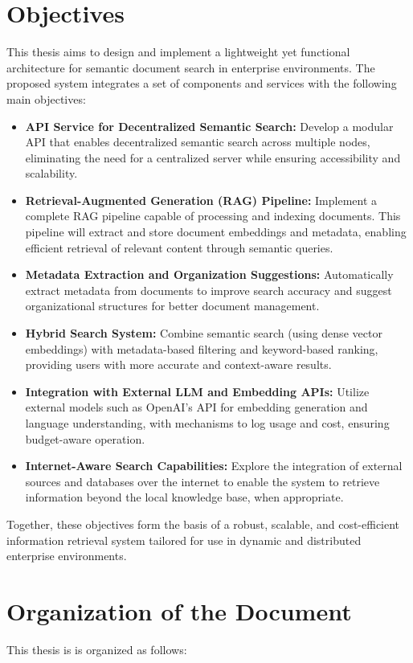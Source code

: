 \section{Objectives}
This thesis aims to design and implement a lightweight yet functional architecture for semantic document search in enterprise environments. The proposed system integrates a set of components and services with the following main objectives:
\begin{itemize}
\item \textbf{API Service for Decentralized Semantic Search:} Develop a modular API that enables decentralized semantic search across multiple nodes, eliminating the need for a centralized server while ensuring accessibility and scalability.
\item \textbf{Retrieval-Augmented Generation (RAG) Pipeline:} Implement a complete RAG pipeline capable of processing and indexing documents. This pipeline will extract and store document embeddings and metadata, enabling efficient retrieval of relevant content through semantic queries.
\item \textbf{Metadata Extraction and Organization Suggestions:} Automatically extract metadata from documents to improve search accuracy and suggest organizational structures for better document management.
\item \textbf{Hybrid Search System:} Combine semantic search (using dense vector embeddings) with metadata-based filtering and keyword-based ranking, providing users with more accurate and context-aware results.
\item \textbf{Integration with External LLM and Embedding APIs:} Utilize external models such as OpenAI’s API for embedding generation and language understanding, with mechanisms to log usage and cost, ensuring budget-aware operation.
\item \textbf{Internet-Aware Search Capabilities:} Explore the integration of external sources and databases over the internet to enable the system to retrieve information beyond the local knowledge base, when appropriate.
\end{itemize}
Together, these objectives form the basis of a robust, scalable, and cost-efficient information retrieval system tailored for use in dynamic and distributed enterprise environments.
\section{Organization of the Document}
This thesis is is organized as follows:  
